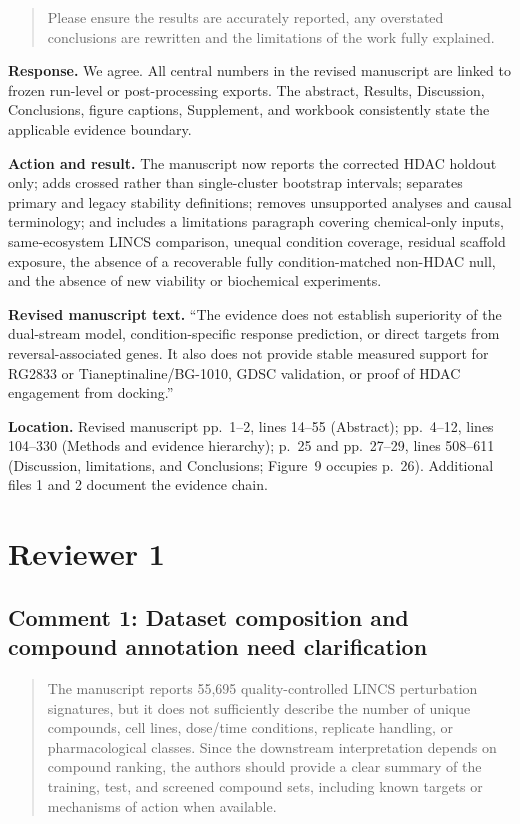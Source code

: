 \documentclass[10pt]{article}
\newenvironment{reviewcomment}{%
  \begin{quote}\small\itshape\color{black}
}{\end{quote}}
\newcommand{\Response}{\textbf{Response.} }
\newcommand{\Action}{\textbf{Action and result.} }
\newcommand{\RevisedText}{\textbf{Revised manuscript text.} }
\newcommand{\Location}{\textbf{Location.} }
\newcommand{\qtext}[1]{``#1''}
\begin{document}
\begin{reviewcomment}
Please ensure the results are accurately reported, any overstated conclusions are rewritten and the limitations of the work fully explained.
\end{reviewcomment}

\Response We agree. All central numbers in the revised manuscript are linked to frozen run-level or post-processing exports. The abstract, Results, Discussion, Conclusions, figure captions, Supplement, and workbook consistently state the applicable evidence boundary.

\Action The manuscript now reports the corrected HDAC holdout only; adds crossed rather than single-cluster bootstrap intervals; separates primary and legacy stability definitions; removes unsupported analyses and causal terminology; and includes a limitations paragraph covering chemical-only inputs, same-ecosystem LINCS comparison, unequal condition coverage, residual scaffold exposure, the absence of a recoverable fully condition-matched non-HDAC null, and the absence of new viability or biochemical experiments.

\RevisedText \qtext{The evidence does not establish superiority of the dual-stream model, condition-specific response prediction, or direct targets from reversal-associated genes. It also does not provide stable measured support for RG2833 or Tianeptinaline/BG-1010, GDSC validation, or proof of HDAC engagement from docking.}

\Location Revised manuscript pp.~1--2, lines 14--55 (Abstract); pp.~4--12, lines 104--330 (Methods and evidence hierarchy); p.~25 and pp.~27--29, lines 508--611 (Discussion, limitations, and Conclusions; Figure~9 occupies p.~26). Additional files 1 and 2 document the evidence chain.

\clearpage
\section*{Reviewer 1}

\subsection*{Comment 1: Dataset composition and compound annotation need clarification}
\begin{reviewcomment}
The manuscript reports 55,695 quality-controlled LINCS perturbation signatures, but it does not sufficiently describe the number of unique compounds, cell lines, dose/time conditions, replicate handling, or pharmacological classes. Since the downstream interpretation depends on compound ranking, the authors should provide a clear summary of the training, test, and screened compound sets, including known targets or mechanisms of action when available.
\end{reviewcomment}
\end{document}
